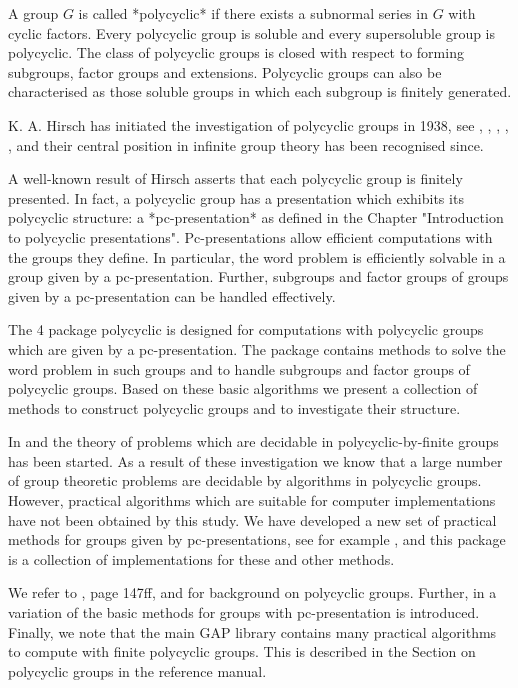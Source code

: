

A group $G$ is called *polycyclic* if there exists a subnormal series
in $G$ with cyclic factors.  Every polycyclic group is soluble and
every supersoluble group is polycyclic.  The class of polycyclic
groups is closed with respect to forming subgroups, factor groups and
extensions. Polycyclic groups can also be characterised as those
soluble groups in which each subgroup is finitely generated.

K. A. Hirsch  has initiated the investigation of  polycyclic groups in
1938,  see \cite{Hir38b},  \cite{Hir38a},  \cite{Hir46}, \cite{Hir52},
\cite{Hir54}, and their central  position in infinite group theory has
been recognised since.

A well-known result of Hirsch asserts that each polycyclic group is
finitely presented. In fact, a polycyclic group has a presentation
which exhibits its polycyclic structure: a *pc-presentation* as defined 
in the Chapter "Introduction to polycyclic presentations". Pc-presentations 
allow efficient computations with the groups they define. In particular, 
the word problem is efficiently solvable in a group given by a
pc-presentation. Further, subgroups and factor groups of groups given
by a pc-presentation can be handled effectively.

The {\GAP} 4 package {\sf polycyclic} is designed for computations
with polycyclic groups which are given by a pc-presentation.  The
package contains methods to solve the word problem in such groups and
to handle subgroups and factor groups of polycyclic groups. Based on
these basic algorithms we present a collection of methods to construct
polycyclic groups and to investigate their structure.

In \cite{BCRS91} and \cite{Seg90} the theory of problems which are 
decidable in polycyclic-by-finite groups has been started. As a result 
of these investigation we know that a large number of group theoretic 
problems are decidable by algorithms in polycyclic groups. However, 
practical algorithms which are suitable for computer implementations
have not been obtained by this study. We have developed a new set of
practical methods for groups given by pc-presentations, see for example
\cite{Eic00}, and this package is a collection of implementations for these 
and other methods. 

We refer to \cite{Rob82}, page 147ff, and \cite{Seg83} for background on 
polycyclic groups. Further, in \cite{Sims94} a variation of the basic 
methods for groups with pc-presentation is introduced. Finally, we note 
that the main GAP library contains many practical algorithms to compute 
with finite polycyclic groups. This is described in the Section on 
polycyclic groups in the reference manual. 


